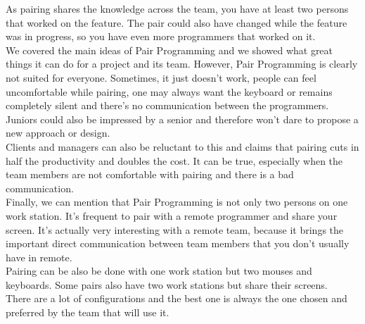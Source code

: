 As pairing shares the knowledge across the team, you have at least two
persons that worked on the feature.
The pair could also have changed while the feature was in progress, so you
have even more programmers that worked on it. \\
\newline
We covered the main ideas of Pair Programming and we showed what great
things it can do for a project and its team.
However, Pair Programming is clearly not suited for everyone.
Sometimes, it just doesn't work, people can feel uncomfortable while
pairing, one may always want the keyboard or remains completely
silent and there's no communication between the programmers.
Juniors could also be impressed by a senior and therefore won't dare to
propose a new approach or design. \\
Clients and managers can also be reluctant to this and claims that
pairing cuts in half the productivity and doubles the cost.
It can be true, especially when the team members are not comfortable with
pairing and there is a bad communication. \\
\newline
Finally, we can mention that Pair Programming is not only two persons on
one work station.
It's frequent to pair with a remote programmer and share your screen.
It's actually very interesting with a remote team, because it brings the
important direct communication between team members that you don't
usually have in remote. \\
Pairing can be also be done with one work station but two mouses and
keyboards.
Some pairs also have two work stations but share their screens. \\
There are a lot of configurations and the best one is always the one
chosen and preferred by the team that will use it.

